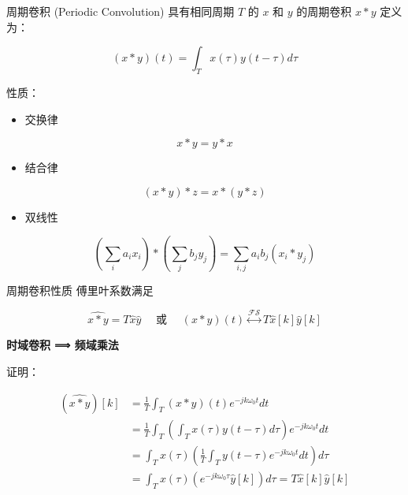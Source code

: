 \documentclass[
  ignorenonframetext,
]{beamer}
\providecommand{\tightlist}{%
  \setlength{\itemsep}{0pt}\setlength{\parskip}{0pt}}
\begin{document}
\begin{frame}{周期卷积 (Periodic Convolution)}
\protect{}\label{ux5468ux671fux5377ux79ef-periodic-convolution}
具有相同周期 \(T\) 的 \(x\) 和 \(y\) 的周期卷积 \(x * y\) 定义为：

\[
(x * y)(t)=\int_{T} x(\tau) y(t-\tau) d \tau
\]

性质：

\begin{itemize}
\tightlist
\item
  交换律
\end{itemize}

\[
x * y=y * x
\]

\begin{itemize}
\tightlist
\item
  结合律
\end{itemize}

\[
(x * y) * z=x *(y * z)
\]

\begin{itemize}
\tightlist
\item
  双线性
\end{itemize}

\[
\left(\sum_{i} a_{i} x_{i}\right) *\left(\sum_{j} b_{j} y_{j}\right)=\sum_{i, j} a_{i} b_{j}\left(x_{i} * y_{j}\right)
\]
\end{frame}

\begin{frame}{周期卷积性质}
\protect{}\label{ux5468ux671fux5377ux79efux6027ux8d28}
傅里叶系数满足

\[
\widehat{x * y}=T \hat{x} \hat{y} \quad \text { 或 } \quad(x * y)(t) \stackrel{\mathcal{F S}}{\longleftrightarrow} T \hat{x}[k] \hat{y}[k]
\]

\textbf{时域卷积 ⟹ 频域乘法}

证明：

\[
\begin{aligned}
(\widehat{x * y})[k] & =\frac{1}{T} \int_{T}(x * y)(t) e^{-j k \omega_{0} t} d t \\
& =\frac{1}{T} \int_{T}\left(\int_{T} x(\tau) y(t-\tau) d \tau\right) e^{-j k \omega_{0} t} d t \\
& =\int_{T} x(\tau)\left(\frac{1}{T} \int_{T} y(t-\tau) e^{-j k \omega_{0} t} d t\right) d \tau \\
& =\int_{T} x(\tau)\left(e^{-j k \omega_{0} \tau} \hat{y}[k]\right) d \tau=T \hat{x}[k] \hat{y}[k]
\end{aligned}
\]
\end{frame}
\end{document}
